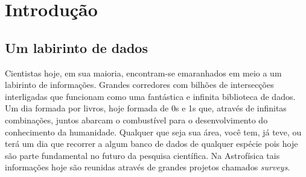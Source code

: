 


\chapter{Introdução}
\label{sec:Intro}


\section{Um labirinto de dados}
\label{sec:Intro:LabData}

Cientistas hoje, em sua maioria, encontram-se emaranhados em meio a um labirinto de informações. Grandes corredores com
bilhões de intersecções interligadas que funcionam como uma fantástica e infinita biblioteca de dados. Um dia formada
por livros, hoje formada de 0s e 1s que, através de infinitas combinações, juntos abarcam o combustível para o
desenvolvimento do conhecimento da humanidade. Qualquer que seja sua área, você tem, já teve, ou terá um dia que
recorrer a algum banco de dados de qualquer espécie pois hoje são parte fundamental no futuro da pesquisa científica. Na
Astrofísica tais informações hoje são reunidas através de grandes projetos chamados {\em surveys}.   


